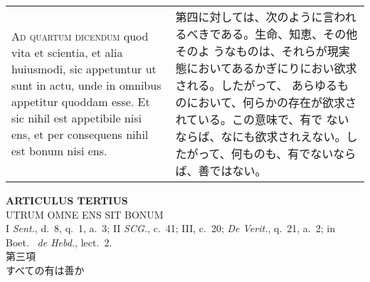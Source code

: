 \documentclass[10pt]{jsarticle}
\begin{document}
\begin{longtable}{p{21em}p{21em}}
\\

{\scshape Ad quartum dicendum} quod vita et scientia, et alia huiusmodi,
 sic appetuntur ut sunt in actu, unde in omnibus appetitur quoddam
 esse. Et sic nihil est appetibile nisi ens, et per consequens nihil est
 bonum nisi ens.

&

第四に対しては、次のように言われるべきである。生命、知恵、その他そのよ
うなものは、それらが現実態においてあるかぎにりにおい欲求される。したがって、
 あらゆるものにおいて、何らかの存在が欲求されている。この意味で、有で
 ないならば、なにも欲求されえない。したがって、何ものも、有でないなら
 ば、善ではない。




\end{longtable}
\newpage
{}
 

\begin{center}
 {\Large {\bf ARTICULUS TERTIUS}}\\
 {\large UTRUM OMNE ENS SIT BONUM}\\
 {\footnotesize I {\itshape Sent.}, d.~8, q.~1, a.~3; II {\itshape
 SCG.}, c.~41; III, c.~20; {\itshape De Verit.}, q.~21, a.~2; in Boet.~
 {\itshape de Hebd.}, lect.~2.}\\
 {\Large 第三項\\すべての有は善か}
\end{center}
\end{document}
